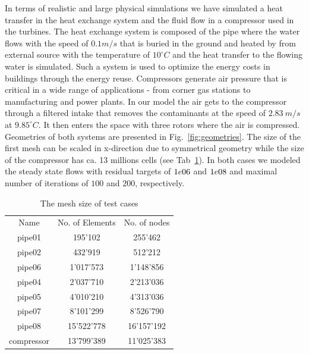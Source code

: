 \documentclass[3p,times]{elsarticle}
\begin{document}
In terms of realistic and large physical simulations we have simulated a heat transfer in the heat exchange system and the fluid flow in a compressor used in the turbines. The heat exchange system is composed of the  pipe where the water flows with the speed of $0.1 m/s$ that is buried in the ground and heated by from external source with the temperature of $10 ^\circ C$ and the heat transfer to the flowing water is simulated. Such a system is used to optimize the energy costs in buildings through the energy reuse.  
Compressors generate air pressure that is critical in a wide range of applications - from corner gas stations to manufacturing and power plants. In our model the air gets to the compressor through a filtered intake that removes the contaminants at the speed of $2.83\ m/s$ at $9.85 ^\circ C$. It then enters the space with three rotors where the air is compressed. Geometries of both systems are presented in Fig.~\ref{fig:geometries}. The size of the first mesh can be scaled  in x-direction due to symmetrical geometry while the size of the compressor has ca. 13 millions cells (see Tab~\ref{tab:MeshSize}). In both cases we modeled the steady state flows with residual targets of $1e\-06$ and $1e\-08$ and maximal number of iterations of $100$ and $200$, respectively. 

\begin{table}
	\centering
		\begin{tabular} {|c|c|c|}
			\hline
			Name & No. of Elements & No. of nodes \\			
			pipe01 & 195'102 & 255'462 \\ \hline
			pipe02 & 432'919 & 512'212 \\ \hline
			pipe06 & 1'017'573 & 1'148'856 \\ \hline
			pipe04 & 2'037'710 & 2'213'036 \\ \hline
			pipe05 & 4'010'210 & 4'313'036 \\ \hline			
			pipe07 & 8'101'299 & 8'526'790 \\ \hline
			pipe08 & 15'522'778 & 16'157'192 \\ \hline
			compressor & 13'799'389  & 11'025'383 \\ \hline
		\end{tabular}
	\caption{The mesh size of test cases}
	\label{tab:MeshSize}
\end{table}
\end{document}
